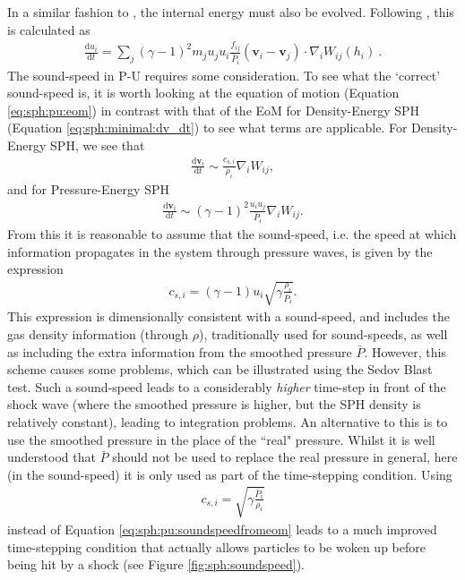 In a similar fashion to \MinimalSPH, the internal energy must also be
evolved. Following \cite{Hopkins2013}, this is calculated as
\begin{align}
  \frac{\mathrm{d}u_i}{\mathrm{d}t} = \sum_j (\gamma - 1)^2 m_j u_j u_i
	\frac{f_{ij}}{\bar{P}_i}(\mathbf{v}_i - \mathbf{v}_j) \cdot
	\nabla_i W_{ij}(h_i)~.
  \label{eq:sph:pu:dudt}
\end{align}
The sound-speed in P-U requires some consideration. To see what the `correct'
sound-speed
is, it is worth looking at the equation of motion (Equation
\ref{eq:sph:pu:eom}) in
contrast with that of the EoM for Density-Energy SPH (Equation
\ref{eq:sph:minimal:dv_dt})
to see what terms are applicable. For Density-Energy SPH, we see that
\begin{align}
  \frac{\mathrm{d}\mathbf{v}_i}{\mathrm{d} t} \sim \frac{c_{s, i}}{\rho_i}
\nabla_i W_{ij},
  \nonumber
\end{align}
and for Pressure-Energy SPH
\begin{align}
  \frac{\mathrm{d}\mathbf{v}_i}{\mathrm{d} t} \sim (\gamma - 1)^2
  \frac{u_i u_j}{\bar{P}_i} \nabla_i W_{ij}.
  \nonumber
\end{align}
From this it is reasonable to assume that the sound-speed, i.e. the speed at
which information propagates in the system through pressure waves, is given by
the expression
\begin{align}
  c_{s, i} = (\gamma - 1) u_i \sqrt{\gamma \frac{\rho_i}{\bar{P_i}}}.
  \label{eq:sph:pu:soundspeedfromeom}
\end{align}
This expression is dimensionally consistent with a sound-speed, and includes
the gas density information (through $\rho$), traditionally used for
sound-speeds, as well as including the extra information from the smoothed
pressure $\bar{P}$. However, this scheme causes some problems, which can be
illustrated using the Sedov Blast test. Such a sound-speed leads to a
considerably \emph{higher} time-step in front of the shock wave (where the
smoothed pressure is higher, but the SPH density is relatively constant),
leading to integration problems. An alternative to this is to use the smoothed
pressure in the place of the ``real" pressure. Whilst it is well understood
that $\bar{P}$ should not be used to replace the real pressure in general, here
(in the sound-speed) it is only used as part of the time-stepping condition.
Using
\begin{align}
  c_{s, i} = \sqrt{\gamma \frac{\bar{P}_i}{\rho_i}}
  \label{eq:sph:pu:soundspeed}
\end{align}
instead of Equation \ref{eq:sph:pu:soundspeedfromeom} leads to a much improved
time-stepping condition that actually allows particles to be woken up before
being hit by a shock (see Figure \ref{fig:sph:soundspeed}).

